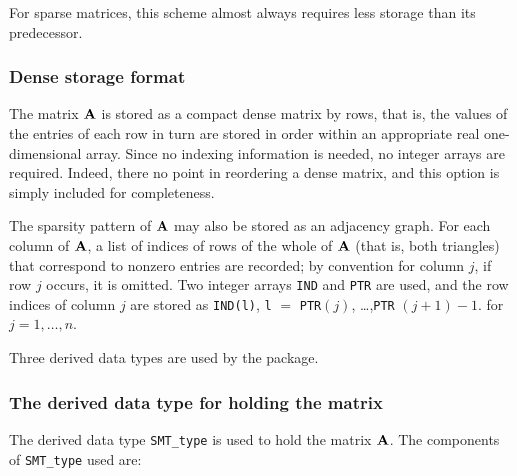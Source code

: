 \documentclass{galahad}
\begin{document}
For sparse matrices, this scheme almost always requires less storage than
its predecessor.

\subsubsection{Dense storage format}\label{dense}
The matrix ${\mathbf{A}}$ is stored as a compact
dense matrix by rows, that is, the values of the entries of each row in turn are
stored in order within an appropriate real one-dimensional array.
Since no indexing information is needed, no integer arrays are required.
Indeed, there no point in reordering a dense matrix, and this option
is simply included for completeness.


\galgraph
The sparsity pattern of ${\mathbf{A}}$ may also be stored as an adjacency graph.
For each column of ${\mathbf{A}}$, a list of indices of rows of the whole of 
${\mathbf{A}}$ (that is, both triangles) that correspond to nonzero entries are 
recorded; by convention for column $j$, if row $j$ occurs, it is omitted. 
Two integer arrays {\tt IND} and {\tt PTR}
are used, and the row indices of column $j$ are stored as
{\tt IND(l)}, {\tt l} $=$ {\tt PTR}$(j)$, \ldots ,{\tt PTR} $(j+1)-1$.
for $j = 1,\ldots,n$.





\galtypes
Three derived data types are used by the package.


\subsubsection{The derived data type for holding the matrix}\label{typeprob}
The derived data type {\tt SMT\_type} is used to hold the matrix ${\mathbf{A}}$.
The components of {\tt SMT\_type} used are:
\end{document}
